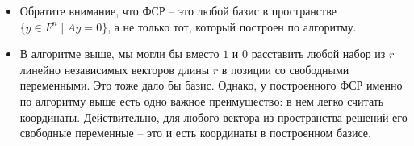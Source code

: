 \begin{itemize}
\item Обратите внимание, что ФСР -- это любой базис в пространстве $\{y\in F^n \mid Ay = 0\}$, а не только тот, который построен по алгоритму.

\item В алгоритме выше, мы могли бы вместо $1$ и $0$ расставить любой набор из $r$ линейно независимых векторов длины $r$ в позиции со свободными переменными.
Это тоже дало бы базис.
Однако, у построенного ФСР именно по алгоритму выше есть одно важное преимущество: в нем легко считать координаты.
Действительно, для любого вектора из пространства решений его свободные переменные -- это и есть координаты в построенном базисе.
\end{itemize}
